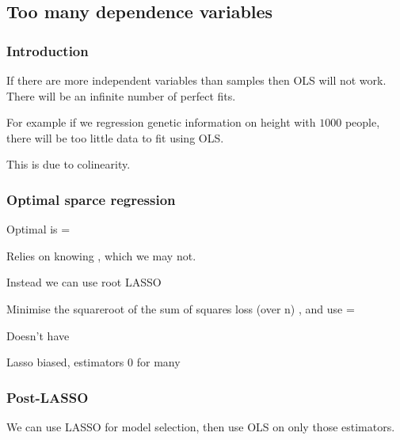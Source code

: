 
\subsection{Too many dependence variables}

\subsubsection{Introduction}

If there are more independent variables than samples then OLS will not work. There will be an infinite number of perfect fits.

For example if we regression genetic information on height with \(1000\) people, there will be too little data to fit using OLS.

This is due to colinearity.

\subsubsection{Optimal sparce regression}

Optimal is \lambda = 

Relies on knowing \sigma, which we may not.

Instead we can use root LASSO

Minimise the squareroot of the sum of squares loss (over n) , and use \lambda = \)

Doesn't have \sigma

Lasso biased, estimators 0 for many

\subsubsection{Post-LASSO}

We can use LASSO for model selection, then use OLS on only those estimators.

